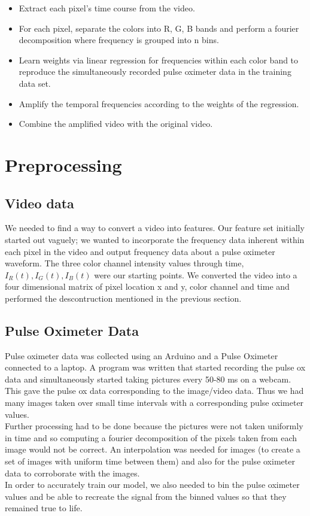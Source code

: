 \documentclass[12pt]{article}
\begin{document}
\begin{itemize}
\item Extract each pixel’s time course from the video. 
\item For each pixel, separate the colors into R, G, B bands and perform a fourier decomposition where frequency is grouped into n bins.
\item Learn weights via linear regression for frequencies within each color band to reproduce the simultaneously recorded pulse oximeter data in the training data set. 
\item Amplify the temporal frequencies according to the weights of the regression.
\item Combine the amplified video with the original video.
\end{itemize}


  


\section{Preprocessing}
\subsection*{Video data}
  We needed to find a way to convert a video into features.
  Our feature set initially started out vaguely; we wanted to incorporate the frequency data inherent within each pixel in the video and output frequency data about a pulse oximeter waveform.
  The three color channel intensity values through time, \(I_R(t), I_G(t), I_B(t)\) were our starting points.
  We converted the video into a four dimensional matrix of pixel location x and y, color channel and time and performed the descontruction mentioned in the previous section.
  
\subsection*{Pulse Oximeter Data}
  Pulse oximeter data was collected using an Arduino and a Pulse Oximeter connected to a laptop. 
  A program was written that started recording the pulse ox data and simultaneously started taking pictures every 50-80 ms on a webcam.
  This gave the pulse ox data corresponding to the image/video data.
  Thus we had many images taken over small time intervals with a corresponding pulse oximeter values.
  \\
  Further processing had to be done because the pictures were not taken uniformly in time and so computing a fourier decomposition of the pixels taken from each image would not be correct.
  An interpolation was needed for images (to create a set of images with uniform time between them) and also for the pulse oximeter data to corroborate with the images.
  \\
  In order to accurately train our model, we also needed to bin the pulse oximeter values and be able to recreate the signal from the binned values so that they remained true to life.
  
\end{document}
